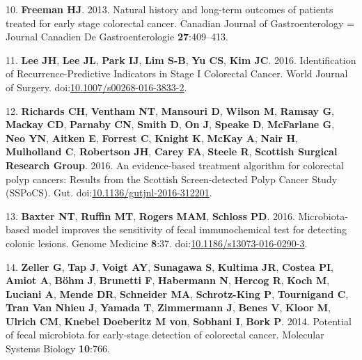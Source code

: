 \documentclass[12pt,]{article}
\begin{document}
\hypertarget{ref-freeman_natural_2013}{}
10. \textbf{Freeman HJ}. 2013. Natural history and long-term outcomes of
patients treated for early stage colorectal cancer. Canadian Journal of
Gastroenterology = Journal Canadien De Gastroenterologie
\textbf{27}:409--413.

\hypertarget{ref-lee_identification_2016}{}
11. \textbf{Lee JH}, \textbf{Lee JL}, \textbf{Park IJ}, \textbf{Lim
S-B}, \textbf{Yu CS}, \textbf{Kim JC}. 2016. Identification of
Recurrence-Predictive Indicators in Stage I Colorectal Cancer. World
Journal of Surgery.
doi:\href{https://doi.org/10.1007/s00268-016-3833-2}{10.1007/s00268-016-3833-2}.

\hypertarget{ref-richards_evidence-based_2016}{}
12. \textbf{Richards CH}, \textbf{Ventham NT}, \textbf{Mansouri D},
\textbf{Wilson M}, \textbf{Ramsay G}, \textbf{Mackay CD},
\textbf{Parnaby CN}, \textbf{Smith D}, \textbf{On J}, \textbf{Speake D},
\textbf{McFarlane G}, \textbf{Neo YN}, \textbf{Aitken E},
\textbf{Forrest C}, \textbf{Knight K}, \textbf{McKay A}, \textbf{Nair
H}, \textbf{Mulholland C}, \textbf{Robertson JH}, \textbf{Carey FA},
\textbf{Steele R}, \textbf{Scottish Surgical Research Group}. 2016. An
evidence-based treatment algorithm for colorectal polyp cancers: Results
from the Scottish Screen-detected Polyp Cancer Study (SSPoCS). Gut.
doi:\href{https://doi.org/10.1136/gutjnl-2016-312201}{10.1136/gutjnl-2016-312201}.

\hypertarget{ref-baxter_microbiota-based_2016}{}
13. \textbf{Baxter NT}, \textbf{Ruffin MT}, \textbf{Rogers MAM},
\textbf{Schloss PD}. 2016. Microbiota-based model improves the
sensitivity of fecal immunochemical test for detecting colonic lesions.
Genome Medicine \textbf{8}:37.
doi:\href{https://doi.org/10.1186/s13073-016-0290-3}{10.1186/s13073-016-0290-3}.

\hypertarget{ref-zeller_potential_2014}{}
14. \textbf{Zeller G}, \textbf{Tap J}, \textbf{Voigt AY},
\textbf{Sunagawa S}, \textbf{Kultima JR}, \textbf{Costea PI},
\textbf{Amiot A}, \textbf{Böhm J}, \textbf{Brunetti F},
\textbf{Habermann N}, \textbf{Hercog R}, \textbf{Koch M},
\textbf{Luciani A}, \textbf{Mende DR}, \textbf{Schneider MA},
\textbf{Schrotz-King P}, \textbf{Tournigand C}, \textbf{Tran Van Nhieu
J}, \textbf{Yamada T}, \textbf{Zimmermann J}, \textbf{Benes V},
\textbf{Kloor M}, \textbf{Ulrich CM}, \textbf{Knebel Doeberitz M von},
\textbf{Sobhani I}, \textbf{Bork P}. 2014. Potential of fecal microbiota
for early-stage detection of colorectal cancer. Molecular Systems
Biology \textbf{10}:766.
\end{document}
